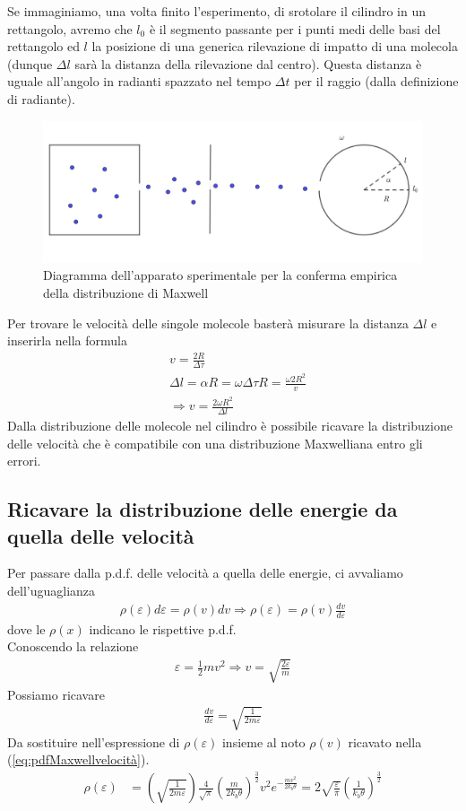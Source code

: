 \documentclass[10pt,a4paper]{article}
\begin{document}
Se immaginiamo, una volta finito l'esperimento, di srotolare il cilindro in un rettangolo, avremo che $l_0$ è il segmento passante per i punti medi delle basi del rettangolo ed $l$ la posizione di una generica rilevazione di impatto di una molecola (dunque $\Delta l$ sarà la distanza della rilevazione dal centro).  Questa distanza è uguale all'angolo in radianti spazzato nel tempo $\Delta t$ per il raggio (dalla definizione di radiante).
\begin{figure}[h!]
	\centering
	\includegraphics[width=0.9\linewidth]{../images/Esperimento_Maxwell}
	\caption{Diagramma dell'apparato sperimentale per la conferma empirica della distribuzione di Maxwell}
	\label{fig:esperimentomaxwell}
\end{figure}
\FloatBarrier
Per trovare le velocità delle singole molecole basterà misurare la distanza $\Delta l$ e inserirla nella formula
\begin{align*} 
	&v =\frac{2 R}{\Delta\tau}\\
	&\Delta l = \alpha R = \omega \Delta\tau R = \frac{\omega 2 R^2}{v}\\
	&\Rightarrow v = \frac{2\omega R^2}{\Delta l}
\end{align*} 
Dalla distribuzione delle molecole nel cilindro è possibile ricavare la distribuzione delle velocità che è compatibile con una distribuzione Maxwelliana entro gli errori.
\subsection{Ricavare la distribuzione delle energie da quella delle velocità}
Per passare dalla p.d.f. delle velocità a quella delle energie, ci avvaliamo dell'uguaglianza
\begin{align*} 
	\rho(\varepsilon)d\varepsilon = \rho(v)dv \Rightarrow \rho(\varepsilon) = \rho(v)\frac{dv}{d\varepsilon}
\end{align*} 
dove le $\rho(x)$ indicano le rispettive p.d.f.\\
Conoscendo la relazione
\begin{align*} 
	\varepsilon = \frac{1}{2}m v ^2 \Rightarrow v = \sqrt{\frac{2 \varepsilon}{m}}
\end{align*} 
Possiamo ricavare 
\begin{align*} 
	\frac{dv}{d\varepsilon} = \sqrt{\frac{1}{2 m \varepsilon}}
\end{align*} 
Da sostituire nell'espressione di $\rho(\varepsilon)$ insieme al noto $\rho(v)$ ricavato nella (\ref{eq:pdfMaxwellvelocità}).
\begin{align*} 
	\rho(\varepsilon)&= \left(\sqrt{\frac{1}{2 m \varepsilon}}\right) \frac{4}{\sqrt{\pi}}\left(\frac{m}{2k_b\theta}\right)^{\frac{3}{2}} v^2 e^{-\frac{mv^2}{2 k_b \theta}}= 2 \sqrt{\frac{\varepsilon}{\pi}} \left(\frac{1}{k_b \theta}\right)^{\frac{3}{2}}
\end{align*}  
\end{document}
